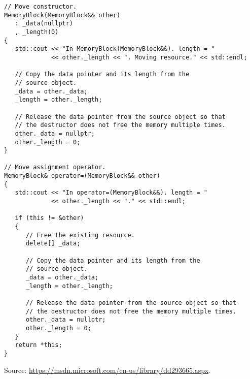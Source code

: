 \documentclass[a4paper]{article}
\begin{document}
\begin{lstlisting}
// Move constructor.
MemoryBlock(MemoryBlock&& other)
   : _data(nullptr)
   , _length(0)
{
   std::cout << "In MemoryBlock(MemoryBlock&&). length = " 
             << other._length << ". Moving resource." << std::endl;

   // Copy the data pointer and its length from the 
   // source object.
   _data = other._data;
   _length = other._length;

   // Release the data pointer from the source object so that
   // the destructor does not free the memory multiple times.
   other._data = nullptr;
   other._length = 0;
}

// Move assignment operator.
MemoryBlock& operator=(MemoryBlock&& other)
{
   std::cout << "In operator=(MemoryBlock&&). length = " 
             << other._length << "." << std::endl;

   if (this != &other)
   {
      // Free the existing resource.
      delete[] _data;

      // Copy the data pointer and its length from the 
      // source object.
      _data = other._data;
      _length = other._length;

      // Release the data pointer from the source object so that
      // the destructor does not free the memory multiple times.
      other._data = nullptr;
      other._length = 0;
   }
   return *this;
}
\end{lstlisting}
Source: \url{https://msdn.microsoft.com/en-us/library/dd293665.aspx}.
\end{document}
